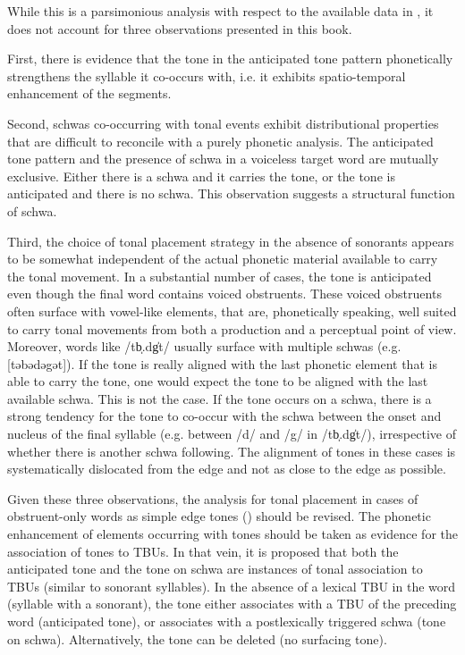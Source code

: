 While this is a parsimonious analysis with respect to the available data in \citet{Grice.etal2015tash}, it does not account for three observations presented in this book. 

First, there is evidence that the tone in the anticipated tone pattern phonetically strengthens the syllable it co-occurs with, i.e. it exhibits spatio-temporal enhancement of the segments. 

Second, schwas co-occurring with tonal events exhibit distributional properties that are difficult to reconcile with a purely phonetic analysis. The anticipated tone pattern and the presence of schwa in a voiceless target word are mutually exclusive. Either there is a schwa and it carries the tone, or the tone is anticipated and there is no schwa. This observation suggests a structural function of schwa. 

Third, the choice of tonal placement strategy in the absence of sonorants appears to be somewhat independent of the actual phonetic material available to carry the tonal movement. In a substantial number of cases, the tone is anticipated even though the final word contains voiced obstruents. These voiced obstruents often surface with vowel-like elements, that are, phonetically speaking, well suited to carry tonal movements from both a production and a perceptual point of view. Moreover, words like /tb̩.dg̍t/ usually surface with multiple schwas (e.g. [təbədəgət]). If the tone is really aligned with the last phonetic element that is able to carry the tone, one would expect the tone to be aligned with the last available schwa. This is not the case. If the tone occurs on a schwa, there is a strong tendency for the tone to co-occur with the schwa between the onset and nucleus of the final syllable (e.g. between /d/ and /g/ in /tb̩.dg̍t/), irrespective of whether there is another schwa following. The alignment of tones in these cases is systematically dislocated from the edge and not as close to the edge as possible.

Given these three observations, the analysis for tonal placement in cases of obstruent-only words as simple edge tones (\citealt{Grice.etal2015tash}) should be revised. The phonetic enhancement of elements occurring with tones should be taken as evidence for the association of tones to TBUs. In that vein, it is proposed that both the anticipated tone and the tone on schwa are instances of tonal association to TBUs (similar to sonorant syllables). In the absence of a lexical TBU in the word (syllable with a sonorant), the tone either associates with a TBU of the preceding word (anticipated tone), or associates with a postlexically triggered schwa (tone on schwa). Alternatively, the tone can be deleted (no surfacing tone).

